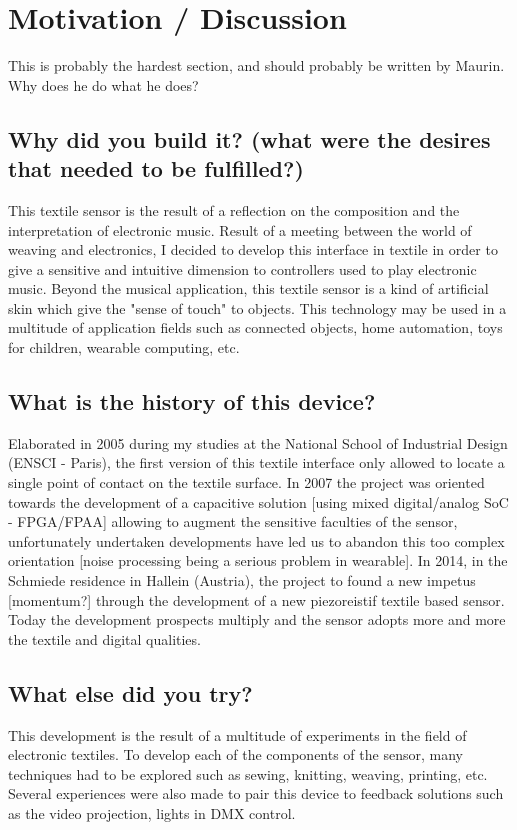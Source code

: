 \documentclass{sigchi-ext}
\begin{document}
\section{Motivation / Discussion}

This is probably the hardest section, and should probably be written by Maurin. Why does he do what he does?


\subsection{Why did you build it? (what were the desires that needed to be fulfilled?)}
This textile sensor is the result of a reflection on the composition and the interpretation of electronic music. Result of a meeting between the world of weaving and electronics, I decided to develop this interface in textile in order to give a sensitive and intuitive dimension to controllers used to play electronic music.
Beyond the musical application, this textile sensor is a kind of artificial skin which give the "sense of touch" to objects. This technology may be used in a multitude of application fields such as connected objects, home automation, toys for children, wearable computing, etc.


\subsection{What is the history of this device?}
Elaborated in 2005 during my studies at the National School of Industrial Design (ENSCI - Paris), the first version of this textile interface only allowed to locate a single point of contact on the textile surface. In 2007 the project was oriented towards the development of a capacitive solution [using mixed digital/analog SoC - FPGA/FPAA] allowing to augment the sensitive faculties of the sensor, unfortunately undertaken developments have led us to abandon this too complex orientation [noise processing being a serious problem in wearable]. In 2014, in the Schmiede residence in Hallein (Austria), the project to found a new impetus [momentum?] through the development of a new piezoreistif textile based sensor. Today the development prospects multiply and the sensor adopts more and more the textile and digital qualities.


\subsection{What else did you try?}
This development is the result of a multitude of experiments in the field of electronic textiles. To develop each of the components of the sensor, many techniques had to be explored such as sewing, knitting, weaving, printing, etc. Several experiences were also made to pair this device to feedback solutions such as the video projection, lights in DMX control.
\end{document}
